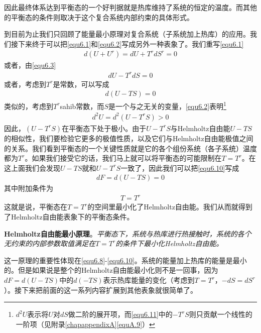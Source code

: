 因此最终体系达到平衡态的一个好判据就是热库维持了系统的恒定的温度。而其他的平衡态的条件则取决于这个复合系统内部约束的具体形式。

到目前为止我们只回顾了能量最小原理对复合系统（子系统加上热库）的应用。我们接下来终于可以把\eqref{equ6.1}和\eqref{equ6.2}写成另外一种表象了。我们重写\eqref{equ6.1}
\begin{align}\label{equ6.8}
d(U+U^r)=dU+T^rdS^r=0
\end{align}
或者，由\eqref{equ6.3}
\begin{align}\label{equ6.9}
dU-T^rdS=0
\end{align}
或者，考虑到$T^r$是常数，可以写成
\begin{align}\label{equ6.10}
d(U-TS)=0
\end{align}
类似的，考虑到$T^r$sahib常数，而$S$是一个与之无关的变量，\eqref{equ6.2}表明\footnote{$d^2U$表示将$U$对$dS$做二阶的展开项，而\eqref{equ6.11}中的$-T^rS$则只贡献一个线性的一阶项（见附录\ref{chapappendixA}\eqref{equA.9}）}
\begin{align}\label{equ6.11}
d^2U=d^2(U-T^rS)>0
\end{align}
因此，$(U-T^rS)$在平衡态下处于极小。由于$U-T^rS$与Helmholtz自由能$U-TS$的相似性，我们要检验它更多的极值性质，以及它们与Helmholtz自由能极值之间的关系。我们看到平衡态的一个关键性质就是它的各个组份系统（各子系统）温度都为$T^r$。如果我们接受它的话，我们马上就可以将平衡态的可能限制在$T=T^r$。在这上面我们会发现$U-TS$就和$U-T^rS$一致了，因此我们可以把\eqref{equ6.10}写成
\begin{align}\label{equ6.12}
dF=d(U-TS)=0
\end{align}
其中附加条件为
\begin{align}\label{equ6.13}
T=T^r
\end{align}
这就是说，平衡态在$T=T^r$的空间里最小化了Helmholtz自由能。我们从而就得到了Helmholtz自由能表象下的平衡态条件。

{\bf Helmholtz自由能最小原理}。{\it 平衡态下，系统与热库进行热接触时，系统的各个无约束的内部参数取值满足在$T=T^r$的条件下最小化Helmholtz自由能。}

这一原理的重要性体现在\eqref{equ6.8}-\eqref{equ6.10}。系统的能量加上热库的能量是最小的。但是如果说是整个的Helmholtz自由能最小化则不是一回事，因为$dF=d(U-TS)$中的$d(-TS)$表示热库能量的变化（考虑到$T=T^r$，$-dS=dS^r$）。接下来把前面的这一系列内容扩展到其他表象就很简单了。

